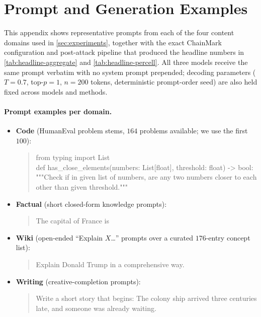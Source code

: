\section{Prompt and Generation Examples}
\label{app:examples}

This appendix shows representative prompts from each of the four
content domains used in \autoref{sec:experiments}, together with the
exact ChainMark configuration and post-attack pipeline that produced
the headline numbers in \autoref{tab:headline-aggregate} and
\autoref{tab:headline-percell}. All three models receive the same
prompt verbatim with no system prompt prepended; decoding parameters
($T{=}0.7$, top-$p{=}1$, $n{=}200$ tokens, deterministic
prompt-order seed) are also held fixed across models and methods.

\paragraph{Prompt examples per domain.}
\begin{itemize}[nosep, leftmargin=*]
  \item \textbf{Code} (HumanEval problem stems, $164$ problems
    available; we use the first $100$):
    \begin{quote}\small\ttfamily
    from typing import List\\
    def has\_close\_elements(numbers: List[float], threshold: float) -> bool:\\
    \quad """Check if in given list of numbers, are any two numbers closer to each other than given threshold."""
    \end{quote}
  \item \textbf{Factual} (short closed-form knowledge prompts):
    \begin{quote}\small\ttfamily
    The capital of France is
    \end{quote}
  \item \textbf{Wiki} (open-ended ``Explain $X$\ldots'' prompts over
    a curated $176$-entry concept list):
    \begin{quote}\small\ttfamily
    Explain Donald Trump in a comprehensive way.
    \end{quote}
  \item \textbf{Writing} (creative-completion prompts):
    \begin{quote}\small\ttfamily
    Write a short story that begins: The colony ship arrived three centuries late, and someone was already waiting.
    \end{quote}
\end{itemize}

